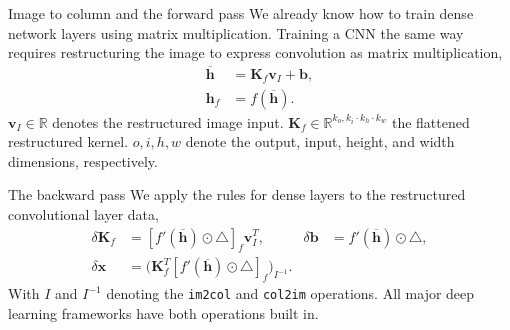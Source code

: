 \documentclass{beamer}
\begin{document}
    \begin{frame}{Image to column and the forward pass}
        We already know how to train dense network layers using matrix multiplication.
        Training a CNN the same way requires restructuring the image to express convolution as matrix multiplication,
        \begin{align}
            \overline{\mathbf{h}} &= \mathbf{K}_f \mathbf{v}_I  + \mathbf{b}, \\ 
            \mathbf{h}_f &= f(\overline{\mathbf{h}}).
        \end{align}
        $\mathbf{v}_I \in \mathbb{R}$ denotes the restructured image input. $\mathbf{K}_f \in \mathbb{R}^{k_o, k_i \cdot k_h \cdot k_w}$ the flattened restructured kernel.
        $o,i,h,w$ denote the output, input, height, and width dimensions, respectively.
    \end{frame}

    \begin{frame}{The backward pass}
        We apply the rules for dense layers to the restructured convolutional layer data,
        \begin{align} 
            \delta \mathbf{K}_f &= [f'(\overline{\mathbf{h}}) \odot \triangle]_f \mathbf{v}^T_I,  &  
            \delta \mathbf{b} &= f'(\overline{\mathbf{h}}) \odot \triangle,   \\  
            \delta \mathbf{x} &= \big(\mathbf{K}_f^T [f'(\overline{\mathbf{h}}) \odot \triangle]_f \big)_{I^{-1}}.
        \end{align}
        With $I$ and $I^{-1}$ denoting the \texttt{im2col} and \texttt{col2im} operations.
        All major deep learning frameworks have both operations built in.
    \end{frame}
\end{document}
